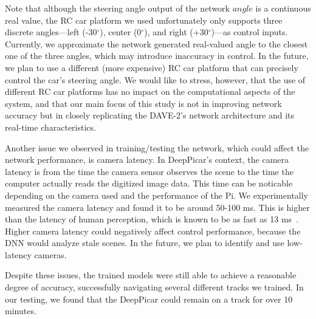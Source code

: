 Note that although the steering angle output of the network $angle$ is
a continuous real value, the RC car platform we used unfortunately
only supports three discrete angles---left (-30$^{\circ}$), center
(0$^{\circ}$), and right (+30$^{\circ}$)---as control inputs.
Currently, we approximate the network generated real-valued
angle to the closest one of the three angles, which may
introduce inaccuracy in control.
In the future, we plan to use a different (more expensive) RC car
platform that can precisely control the car's steering angle.
We would like to stress, however, that the use of different RC car
platforms has no impact on the computational 
aspects of the system, and that our main focus of this study is
not in improving network accuracy but in closely replicating the
DAVE-2's network architecture and its real-time characteristics.

Another issue we observed in training/testing the network, which could
affect the network performance, is camera latency. In DeepPicar's
context, the camera latency is from the time the camera
sensor observes the scene to the time the computer actually reads the
digitized image data. This time can be noticable depending on the camera 
used and the performance of the Pi. We experimentally measured the camera
latency and found it to be around 50-100 ms. This is higher than the 
latency of human perception, which is known to be as fast as 13 
ms~\cite{ThomasBurger2015}. Higher camera latency could negatively 
affect control performance, because the DNN would analyze stale scenes. 
In the future, we plan to identify and use low-latency cameras.


Despite these issues, the trained models were still able to
achieve a reasonable degree of accuracy, successfully navigating
several different tracks we trained. In our testing, we found that the
DeepPicar could remain on a track for over 10 minutes.
